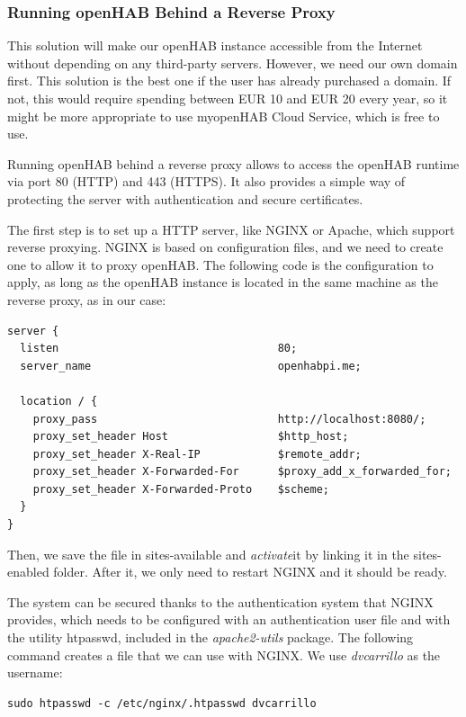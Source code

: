 \subsubsection{Running openHAB Behind a Reverse Proxy}
This solution will make our openHAB instance accessible from the Internet without depending on any third-party servers. However,
we need our own domain first. This solution is the best one if the user has already purchased a domain. If not, this would require
spending between EUR 10 and EUR 20 every year\cite{startBloggingDomainCost}, so it might be more appropriate to use myopenHAB
Cloud Service, which is free to use.

Running openHAB behind a reverse proxy allows to access the openHAB runtime via port 80 (HTTP) and 443 (HTTPS). It also provides a
simple way of protecting the server with authentication and secure certificates.

The first step is to set up a HTTP server, like NGINX or Apache, which support reverse proxying. NGINX is based on configuration
files, and we need to create one to allow it to proxy openHAB. The following code is the configuration to apply, as long as the
openHAB instance is located in the same machine as the reverse proxy, as in our case:

\begin{lstlisting}[style=Consola]
server {
  listen                                  80;
  server_name                             openhabpi.me;

  location / {
    proxy_pass                            http://localhost:8080/;
    proxy_set_header Host                 $http_host;
    proxy_set_header X-Real-IP            $remote_addr;
    proxy_set_header X-Forwarded-For      $proxy_add_x_forwarded_for;
    proxy_set_header X-Forwarded-Proto    $scheme;
  }
}
\end{lstlisting}

Then, we save the file in sites-available and \textit{activate}it by linking it in the sites-enabled folder. After it, we only need
to restart NGINX and it should be ready.

The system can be secured thanks to the authentication system that NGINX provides, which needs to be configured with an
authentication user file and with the utility htpasswd, included in the \textit{apache2-utils} package. The following command
creates a file that we can use with NGINX. We use \textit{dvcarrillo} as the username:

\begin{lstlisting}[style=Consola]
sudo htpasswd -c /etc/nginx/.htpasswd dvcarrillo
\end{lstlisting}

